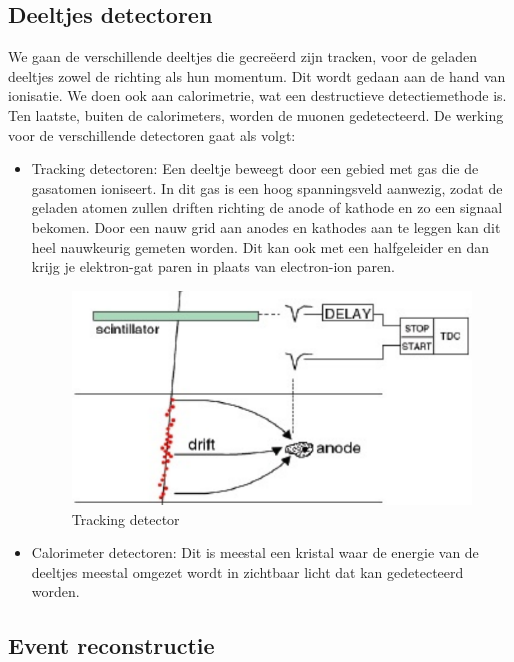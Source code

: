 \documentclass[../main.tex]{subfiles}
\begin{document}
\subsection{Deeltjes detectoren}%
\label{sub:deeltjes_detectoren}

We gaan de verschillende deeltjes die gecreëerd zijn tracken, voor de geladen deeltjes zowel de richting als hun momentum. Dit wordt gedaan aan de hand van ionisatie. We doen ook aan calorimetrie, wat een destructieve detectiemethode is. Ten laatste, buiten de calorimeters, worden de muonen gedetecteerd. De werking voor de verschillende detectoren gaat als volgt:
\begin{itemize}
    \item Tracking detectoren: Een deeltje beweegt door een gebied met gas die de gasatomen ioniseert. In dit gas is een hoog spanningsveld aanwezig, zodat de geladen atomen zullen driften richting de anode of kathode en zo een signaal bekomen. Door een nauw grid aan anodes en kathodes aan te leggen kan dit heel nauwkeurig gemeten worden. Dit kan ook met een halfgeleider en dan krijg je elektron-gat paren in plaats van electron-ion paren.
        \begin{figure}[h]
            \centering
            \includegraphics[width=0.8\linewidth]{introduction_and_review/tracking_detector.png}
            \caption{Tracking detector}%
            \label{fig:tracking_detector}
        \end{figure}
    \item Calorimeter detectoren: Dit is meestal een kristal waar de energie van de deeltjes meestal omgezet wordt in zichtbaar licht dat kan gedetecteerd worden.
\end{itemize}

\subsection{Event reconstructie}%
\label{sub:event_reconstructie}
\end{document}
